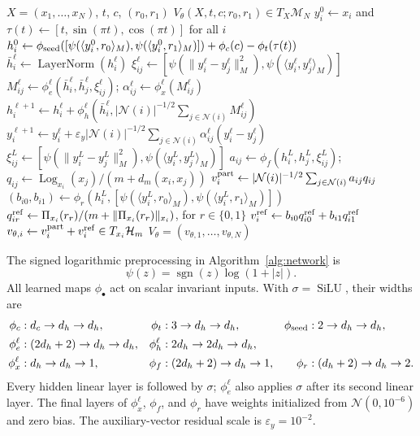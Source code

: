 \documentclass[10pt]{article}
\newcommand{\HH}{\mathcal{H}}
\newcommand{\Log}{\operatorname{Log}}
\newcommand{\Proj}{\Pi}
\newcommand{\dist}{d_m}
\begin{document}
\begin{algorithm}[H]
\caption{LorentzNet-H vector field $V_\theta(X,t,c;r_0,r_1)$}
\label{alg:network}
\small
\begin{algorithmic}[1]
\Require $X=(x_1,\ldots,x_N)$, $t$, $c$, $(r_0,r_1)$
\Ensure $V_\theta(X,t,c;r_0,r_1)\in T_X\mathcal{M}_N$
\State $y_i^0\gets x_i$ and $\tau(t)\gets[t,\sin(\pi t),\cos(\pi t)]$ for all $i$
\State $h_i^0\gets\phi_{\rm seed}([\psi(\langle y_i^0,r_0\rangle_M),\psi(\langle y_i^0,r_1\rangle_M)])+\phi_c(c)-\phi_t(\tau(t))$
  \State $\bar h_i^\ell\gets\operatorname{LayerNorm}(h_i^\ell)$
    \State $\xi_{ij}^\ell\gets[\psi(\|y_i^\ell-y_j^\ell\|_M^2),\psi(\langle y_i^\ell,y_j^\ell\rangle_M)]$
    \State $M_{ij}^\ell\gets\phi_e^\ell(\bar h_i^\ell,\bar h_j^\ell,\xi_{ij}^\ell)$; \quad $\alpha_{ij}^\ell\gets\phi_x^\ell(M_{ij}^\ell)$
  \EndFor
  \State $h_i^{\ell+1}\gets h_i^\ell+\phi_h^\ell\!\left(\bar h_i^\ell,|\mathcal{N}(i)|^{-1/2}\sum_{j\in\mathcal{N}(i)}M_{ij}^\ell\right)$
  \State $y_i^{\ell+1}\gets y_i^\ell+\varepsilon_y|\mathcal{N}(i)|^{-1/2}\sum_{j\in\mathcal{N}(i)}\alpha_{ij}^\ell(y_i^\ell-y_j^\ell)$
\EndFor
{}
  \State $\xi_{ij}^L\gets[\psi(\|y_i^L-y_j^L\|_M^2),\psi(\langle y_i^L,y_j^L\rangle_M)]$
  \State $a_{ij}\gets\phi_f(h_i^L,h_j^L,\xi_{ij}^L)$; \quad $q_{ij}\gets\Log_{x_i}(x_j)/(m+\dist(x_i,x_j))$
\EndFor
\State $v_i^{\rm part}\gets|\mathcal{N}(i)|^{-1/2}\sum_{j\in\mathcal{N}(i)}a_{ij}q_{ij}$
\State $(b_{i0},b_{i1})\gets\phi_r(h_i^L,[\psi(\langle y_i^L,r_0\rangle_M),\psi(\langle y_i^L,r_1\rangle_M)])$
\State $q_{ir}^{\rm ref}\gets\Proj_{x_i}(r_r)/(m+\|\Proj_{x_i}(r_r)\|_{x_i})$, for $r\in\{0,1\}$
\State $v_i^{\rm ref}\gets b_{i0}q_{i0}^{\rm ref}+b_{i1}q_{i1}^{\rm ref}$
\State $v_{\theta,i}\gets v_i^{\rm part}+v_i^{\rm ref}\in T_{x_i}\HH_m$
\State \Return $V_\theta=(v_{\theta,1},\ldots,v_{\theta,N})$
\end{algorithmic}
\end{algorithm}

The signed logarithmic preprocessing in Algorithm~\ref{alg:network} is
\begin{equation}
 \psi(z)=\operatorname{sgn}(z)\log(1+|z|).
 \label{eq:signed-log}
\end{equation}
All learned maps $\phi_\bullet$ act on scalar invariant inputs. With
$\sigma=\operatorname{SiLU}$, their widths are
\begin{align}
 \phi_c &: d_c\to d_h\to d_h,& \phi_t &: 3\to d_h\to d_h,&
 \phi_{\rm seed}&:2\to d_h\to d_h,\\
 \phi_e^\ell &: (2d_h+2)\to d_h\to d_h,&
 \phi_h^\ell &:2d_h\to2d_h\to d_h,\\
 \phi_x^\ell &:d_h\to d_h\to1,&
 \phi_f &: (2d_h+2)\to d_h\to1,&
 \phi_r &: (d_h+2)\to d_h\to2.
 \label{eq:mlp-widths}
\end{align}
Every hidden linear layer is followed by $\sigma$; $\phi_e^\ell$ also applies
$\sigma$ after its second linear layer. The final layers of $\phi_x^\ell$, $\phi_f$,
and $\phi_r$ have weights initialized from $\mathcal{N}(0,10^{-6})$ and zero bias.
The auxiliary-vector residual scale is $\varepsilon_y=10^{-2}$.
\end{document}
